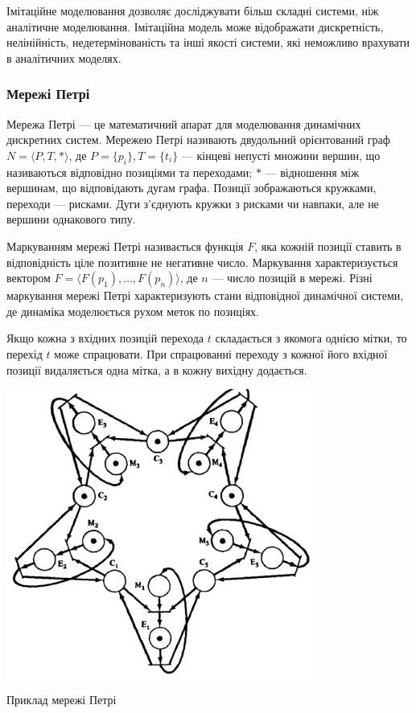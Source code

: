 Імітаційне моделювання дозволяє досліджувати більш складні системи, ніж аналітичне моделювання. Імітаційна модель може відображати дискретність, нелінійність, недетермінованість та інші якості системи, які неможливо врахувати в аналітичних моделях. 

\subsubsection{Мережі Петрі}
Мережа Петрі --- це математичний апарат для моделювання динамічних дискретних систем. Мережею Петрі називають двудольний орієнтований граф \mbox {$ N = \langle P, T, * \rangle $}, де \mbox{$ P = \{p_i\}, T = \{t_i\} $} --- кінцеві непусті множини вершин, що називаються відповідно позиціями та переходами; $*$ --- відношення між вершинам, що відповідають дугам графа. Позиції зображаються кружками, переходи --- рисками. Дуги з’єднують кружки з рисками чи навпаки, але не вершини однакового типу.

Маркуванням мережі Петрі називається функція $F$, яка кожній позиції ставить в відповідність ціле позитивне не негативне число. Маркування характеризується вектором \mbox{$ F = \langle F(p_1), \dots, F(p_n) \rangle $}, де $n$ --- число позицій в мережі.
Різні маркування мережі Петрі характеризують стани відповідної динамічної системи, де динаміка моделюється рухом меток по позиціях.

Якщо кожна з вхідних позицій перехода $t$ складається з якомога однією мітки, то перехід $t$ може спрацювати. При спрацюванні переходу з кожної його вхідної позиції видаляється одна мітка, а в кожну вихідну додається.

            \begin{stdfigure}
                \includegraphics[width=4in]{images/petri_net_example.png}
                \caption{Приклад мережі Петрі}
                \label{fig:petri_net_example}
            \end{stdfigure}   

